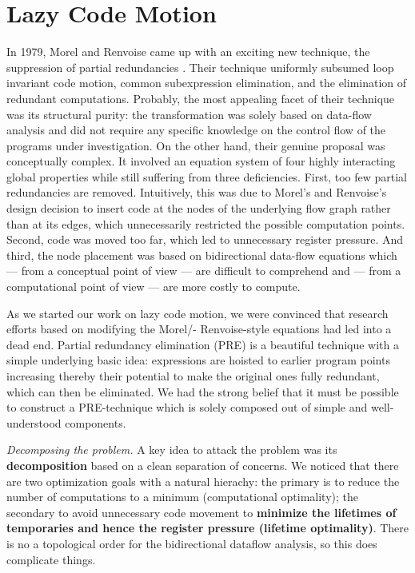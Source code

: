 \newpage


\section{Lazy Code Motion}

In 1979, Morel and Renvoise came up with an exciting new technique,
the suppression of partial redundancies \cite{morel1979global}. Their technique
uniformly subsumed loop invariant code motion, common
subexpression elimination, and the elimination of redundant
computations. Probably, the most appealing facet of their
technique was its structural purity: the transformation was
solely based on data-flow analysis and did not require any
specific knowledge on the control flow of the programs under investigation. On the other hand, their genuine proposal
was conceptually complex. It involved an equation system
of four highly interacting global properties while still suffering from three deficiencies. First, too few partial redundancies are removed. Intuitively, this was due to Morel’s and
Renvoise’s design decision to insert code at the nodes of the
underlying flow graph rather than at its edges, which unnecessarily restricted the possible computation points. Second,
code was moved too far, which led to unnecessary register
pressure. And third, the node placement was based on bidirectional data-flow equations which — from a conceptual
point of view — are difficult to comprehend and — from a
computational point of view — are more costly to compute.

As we started our work on lazy code motion, we were convinced that research efforts based on modifying the Morel/-
Renvoise-style equations had led into a dead end. Partial redundancy elimination (PRE) is a beautiful technique with
a simple underlying basic idea: expressions are hoisted to
earlier program points increasing thereby their potential to
make the original ones fully redundant, which can then be
eliminated. We had the strong belief that it must be possible to construct a PRE-technique which is solely composed
out of simple and well-understood components.

\textit{Decomposing the problem.} A key idea to attack the problem was its \textbf{decomposition} based on a clean separation of
concerns. We noticed that there are two optimization goals
with a natural hierachy: the primary is to reduce the number of computations to a minimum (computational optimality);
the secondary to avoid unnecessary code movement to
\textbf{minimize the lifetimes of temporaries and hence the register
	pressure (lifetime optimality)}. There is no a topological order for the bidirectional dataflow analysis, so this does complicate things.

